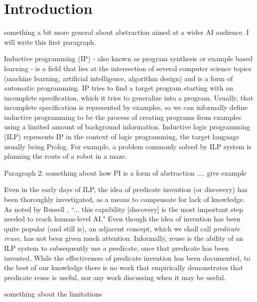 \section{Introduction}

\ac{something a bit more general about abstraction aimed at a wider AI audience. I will write this first paragraph.}

Inductive programming (IP) \cite{indprogmeets} - also known as program synthesis or example based learning - is a field that lies at the intersection of several computer science topics (machine learning, artificial intelligence, algorithm design) and is a form of automatic programming. IP tries to find a target program starting with an incomplete specification, which it tries to generalize into a program. Usually, that incomplete specification is represented by examples, so we can informally define inductive programming to be the process of creating programs from examples using a limited amount of background information. Inductive logic programming (ILP) represents IP in the context of logic programming, the target language usually being Prolog. For example, a problem commonly solved by ILP system is planning the route of a robot in a maze.

\ac{Paragraph 2: something about how PI is a form of abstraction ....}
\ac{give example}

\par Even in the early days of ILP, the idea of predicate invention (or discovery) has been thoroughly investigated, as a means to compensate for lack of knowledge. As noted by Russell \cite{humancompatible}, ``... this capability [discovery] is the most important step needed to reach human-level AI." Even though the idea of invention has been quite popular (and still is), an adjacent concept, which we shall call \emph{predicate reuse}, has not been given much attention. Informally, reuse is the ability of an ILP system to subsequently use a predicate, once that predicate has been invented. While the effectiveness of predicate invention has been documented, to the best of our knowledge there is no work that empirically demonstrates that predicate reuse is useful, nor any work discussing when it may be useful.

\ac{something about the limitations}

